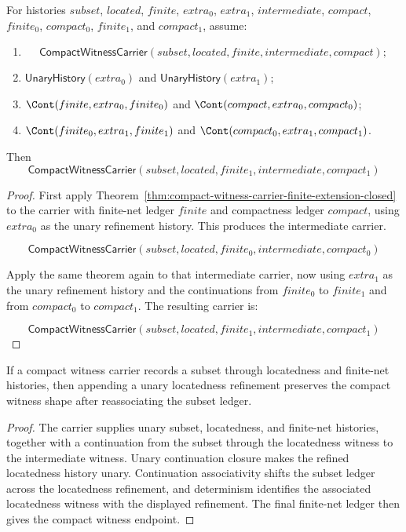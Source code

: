 \begin{theorem}
\label{thm:compact-witness-carrier-iterated-finite-refinement-closed}
For histories $subset$, $located$, $finite$, $extra_0$, $extra_1$,
$intermediate$, $compact$, $finite_0$, $compact_0$, $finite_1$, and
$compact_1$, assume:
\begin{enumerate}
  \item
  $$
  \mathsf{CompactWitnessCarrier}(subset,located,finite,intermediate,compact);
  $$
  \item $\mathsf{UnaryHistory}(extra_0)$ and
  $\mathsf{UnaryHistory}(extra_1)$;
  \item $\Cont(finite,extra_0,finite_0)$ and
  $\Cont(compact,extra_0,compact_0)$;
  \item $\Cont(finite_0,extra_1,finite_1)$ and
  $\Cont(compact_0,extra_1,compact_1)$.
\end{enumerate}
Then
$$
\mathsf{CompactWitnessCarrier}(subset,located,finite_1,intermediate,compact_1)
$$
\end{theorem}
\begin{proof}
First apply Theorem~\ref{thm:compact-witness-carrier-finite-extension-closed} to
the carrier with finite-net ledger $finite$ and compactness ledger $compact$,
using $extra_0$ as the unary refinement history. This produces the intermediate
carrier.

$$
\mathsf{CompactWitnessCarrier}(subset,located,finite_0,intermediate,compact_0)
$$

Apply the same theorem again to that intermediate carrier, now using $extra_1$
as the unary refinement history and the continuations from $finite_0$ to
$finite_1$ and from $compact_0$ to $compact_1$. The resulting carrier is:

$$
\mathsf{CompactWitnessCarrier}(subset,located,finite_1,intermediate,compact_1)
$$
\end{proof}

\begin{theorem}
\label{thm:compact-witness-carrier-located-extension-closed}
If a compact witness carrier records a subset through locatedness and finite-net
histories, then appending a unary locatedness refinement preserves the compact
witness shape after reassociating the subset ledger.
\end{theorem}
\begin{proof}
The carrier supplies unary subset, locatedness, and finite-net histories,
together with a continuation from the subset through the locatedness witness to
the intermediate witness. Unary continuation closure makes the refined
locatedness history unary. Continuation associativity shifts the subset ledger
across the locatedness refinement, and determinism identifies the associated
locatedness witness with the displayed refinement. The final finite-net ledger
then gives the compact witness endpoint.
\end{proof}

